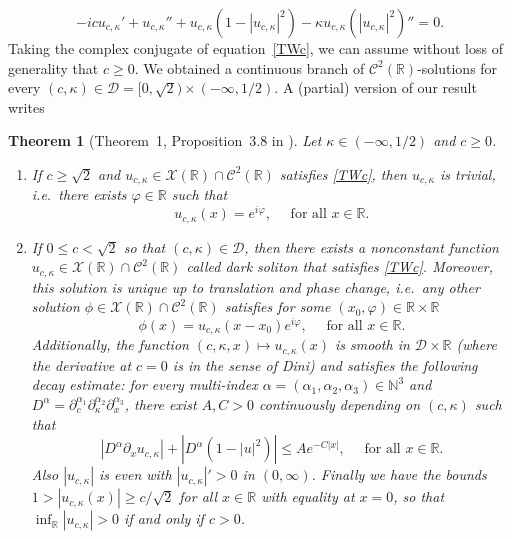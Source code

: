 \documentclass[11pt]{article}
\newcommand{\N}{\mathbb{N}}
\newcommand{\R}{\mathbb{R}}
\newcommand{\boC}{\mathcal{C}}
\theoremstyle{plain}
\newtheorem{theorem}{Theorem}[section]
\theoremstyle{definition}
\theoremstyle{remark}
\numberwithin{equation}{section}
\begin{document}
{	\begin{equation}
		\label{TWc}\tag{TW$(c,\kappa)$}
		-icu_{c,\kappa}'+u_{c,\kappa}''+u_{c,\kappa} (1-|u_{c,\kappa}|^2)-\kappa u_{c,\kappa}\left(|u_{c,\kappa}|^2\right)''=0.
	\end{equation}
	Taking the complex conjugate of equation~\eqref{TWc}, we can assume without loss of generality that $c\geq0$. We obtained a continuous branch of $\boC^{2}(\R)$-solutions for every $(c,\kappa)\in\mathcal{D}=[0,\sqrt{2})\times(-\infty,1/2)$. A (partial) version of our result writes
	\begin{theorem}[Theorem~1, Proposition~3.8 in \cite{delaire2023exotic}]
		\label{thm:classiftw}
		Let $\kappa\in(-\infty,1/2)$ and $c\geq0$.
		\begin{enumerate}
			\item If $c\geq\sqrt{2}$ and $u_{c,\kappa}\in\mathcal{X}(\R)\cap\boC^{2}(\R)$  satisfies \eqref{TWc}, then $u_{c,\kappa}$ is trivial, i.e.\ there exists $\varphi\in\R$ such that 
			$$u_{c,\kappa}(x)=e^{i\varphi},\quad\text{ for all } x\in\R.$$  
			\item If $0\leq c<\sqrt{2}$ so that $(c,\kappa)\in\mathcal{D}$, then there exists a nonconstant function $u_{c,\kappa}\in\mathcal{X}(\R)\cap\boC^{2}(\R)$ called dark soliton that satisfies \eqref{TWc}.
			Moreover, this solution is unique up to translation and phase change, i.e.\
			any other solution $\phi\in\mathcal{X}(\R)\cap\boC^{2}(\R)$ satisfies for some $(x_0,\varphi)\in\R\times\R$ $$\phi(x)=u_{c,\kappa}(x-x_0)e^{i\varphi},\quad\text{ for all }x\in\R.$$ 
			Additionally, the function $(c,\kappa,x)\mapsto u_{c,\kappa}(x)$ is smooth in $\mathcal{D}\times\R$ (where the derivative at $c=0$ is in the sense of Dini) and satisfies the following decay estimate: for every multi-index $\alpha=(\alpha_1,\alpha_2,\alpha_3)\in\N^3$ and $D^\alpha=\partial_c^{\alpha_1}\partial_\kappa^{\alpha_2}\partial_{x}^{\alpha_3}$, there exist $A,C>0$ continuously depending on $(c,\kappa)$ such that
			\begin{equation}\label{eq:decaydark}
				|D^\alpha\partial_xu_{c,\kappa}|+|D^\alpha(1-|u|^2)|\leq Ae^{-C|x|},\quad\text{ for all }x\in\R.
			\end{equation}
			Also $|u_{c,\kappa}|$ is even with $|u_{c,\kappa}|'>0$ in $(0,\infty)$. Finally we have the bounds $1>|u_{c,\kappa}(x)|\geq c/\sqrt{2}$ for all $x\in\R$ with equality at $x=0$, so that $\inf_\R|u_{c,\kappa}|>0$ if and only if $c>0$.
		\end{enumerate} 
	\end{theorem}
}
\end{document}
